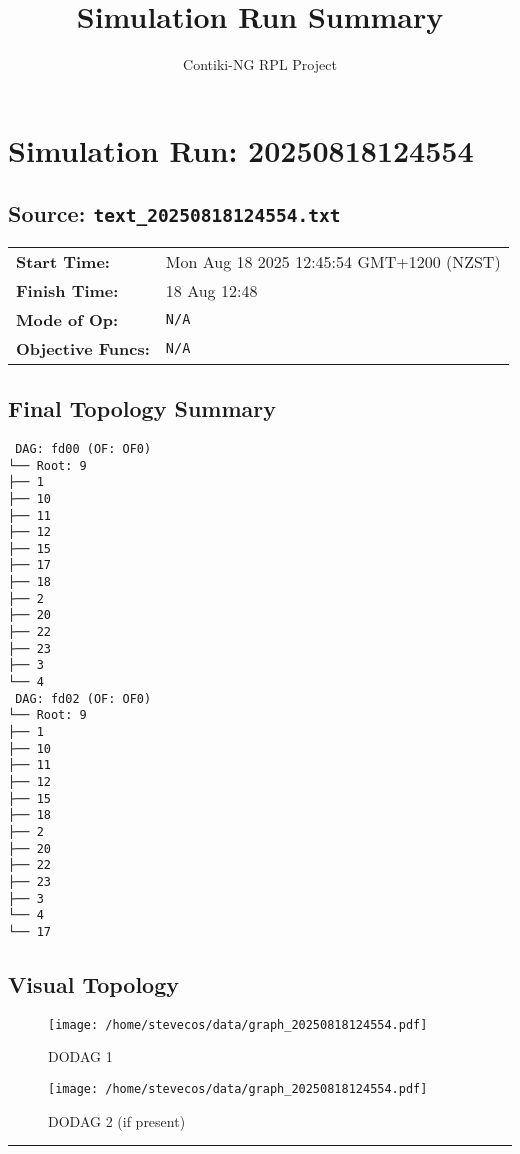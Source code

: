\documentclass[a4paper]{article}
\begin{document}
\title{Simulation Run Summary}
\author{Contiki-NG RPL Project}
\maketitle


\section*{Simulation Run: 20250818124554}
\subsection*{Source: \texttt{text\_20250818124554.txt}}

\begin{tabular}{@{}ll}
\textbf{Start Time:} & Mon Aug 18 2025 12:45:54 GMT+1200 (NZST) \\
\textbf{Finish Time:} & 18 Aug 12:48 \\
\textbf{Mode of Op:} & \texttt{N/A} \\
\textbf{Objective Funcs:} & \texttt{N/A} \\
\end{tabular}

\subsection*{Final Topology Summary}
\begin{lstlisting}
 DAG: fd00 (OF: OF0)
└── Root: 9
├── 1
├── 10
├── 11
├── 12
├── 15
├── 17
├── 18
├── 2
├── 20
├── 22
├── 23
├── 3
└── 4
 DAG: fd02 (OF: OF0)
└── Root: 9
├── 1
├── 10
├── 11
├── 12
├── 15
├── 18
├── 2
├── 20
├── 22
├── 23
├── 3
└── 4
└── 17
\end{lstlisting}

\subsection*{Visual Topology}
\begin{figure}[h!]
    \centering
    \begin{minipage}{0.48\textwidth}
        \centering
        \texttt{[image: /home/stevecos/data/graph\_20250818124554.pdf]}
        \caption*{DODAG 1}
    \end{minipage}
    \hfill
    \begin{minipage}{0.48\textwidth}
        \centering
        \texttt{[image: /home/stevecos/data/graph\_20250818124554.pdf]}
        \caption*{DODAG 2 (if present)}
    \end{minipage}
\end{figure}

\hrule
\clearpage
\end{document}
